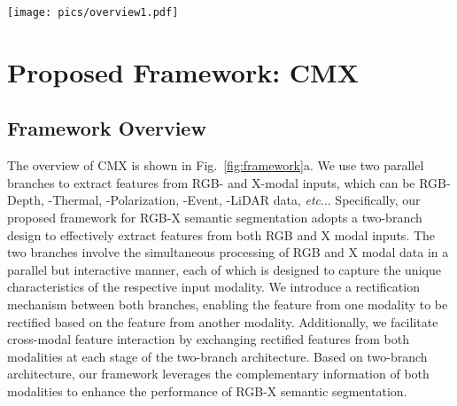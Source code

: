 \documentclass[journal]{IEEEtran}
\makeatletter
\DeclareRobustCommand\onedot{\futurelet\@let@token\@onedot}
\def\@onedot{\ifx\@let@token.\else.\null\fi\xspace}
\def\eg{\emph{e.g}\onedot} \def\Eg{\emph{E.g}\onedot}
\def\etc{\emph{etc}\onedot} \def\vs{\emph{vs}\onedot}
\makeatother
\begin{document}
\begin{figure*}[t]
\begin{center}
    \texttt{[image: pics/overview1.pdf]}
\end{center}
   \caption{{a) Overview of \emph{CMX} for \emph{RGB-X semantic segmentation}. The inputs are RGB and another modality (\eg, Depth, Thermal, Polarization, Event, or LiDAR). b) Cross-Modal Feature Rectification Module (\emph{CM-FRM}) with colored arrows as information flows of the two modalities. c) Feature Fusion Module (\emph{FFM}) with two stages of information exchange and fusion.}
   }
\label{fig:framework}
\end{figure*}

\section{Proposed Framework: CMX}
\subsection{Framework Overview}
\label{sec:framework_overview}
The overview of CMX is shown in Fig.~\ref{fig:framework}a.
We use two parallel branches to extract features from RGB- and X-modal inputs, which can be RGB-Depth, -Thermal, -Polarization, -Event, -LiDAR data, \etc. Specifically, our proposed framework for RGB-X semantic segmentation adopts a two-branch design to effectively extract features from both RGB and X modal inputs. The two branches involve the simultaneous processing of RGB and X modal data in a parallel but interactive manner, each of which is designed to capture the unique characteristics of the respective input modality. We introduce a rectification mechanism between both branches, enabling the feature from one modality to be rectified based on the feature from another modality. Additionally, we facilitate cross-modal feature interaction by exchanging rectified features from both modalities at each stage of the two-branch architecture. Based on two-branch architecture, our framework leverages the complementary information of both modalities to enhance the performance of RGB-X semantic segmentation.
\end{document}
